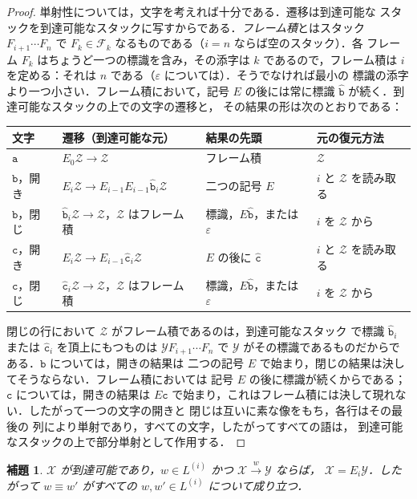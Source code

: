 \documentclass[11pt,a4paper]{ltjsarticle}
\numberwithin{equation}{section}
\theoremstyle{plain}
\newtheorem{lemma}[theorem]{補題}
\theoremstyle{definition}
\theoremstyle{remark}
\newcommand{\eps}{\varepsilon}
\theoremstyle{plain}
\begin{document}
\begin{proof}
単射性については，文字を考えれば十分である．遷移は到達可能な
スタックを到達可能なスタックに写すからである．\emph{フレーム積}とはスタック
$F_{i+1}\cdots F_n$ で $F_k\in\mathcal F_k$ なるものである（$i=n$ ならば空のスタック）．各
フレーム $F_k$ はちょうど一つの標識を含み，その添字は $k$ であるので，フレーム積は
$i$ を定める：それは $n$ である（$\eps$ については）．そうでなければ最小の
標識の添字より一つ小さい．フレーム積において，記号 $E$ の後には常に標識
$\hat{\mathtt b}$ が続く．到達可能なスタックの上での文字の遷移と，
その結果の形は次のとおりである：
\begin{center}
\footnotesize
\renewcommand{\arraystretch}{1.15}
\begin{tabular}{@{}llll@{}}
\hline
文字 & 遷移（到達可能な元） & 結果の先頭 & 元の復元方法\\
\hline
$\mathtt a$ & $E_0\mathcal Z\to\mathcal Z$ & フレーム積 & $\mathcal Z$\\
$\mathtt b$，開き & $E_i\mathcal Z\to E_{i-1}E_{i-1}\hat{\mathtt b}_i\mathcal Z$ & 二つの記号 $E$ & $i$ と $\mathcal Z$ を読み取る\\
$\mathtt b$，閉じ & $\hat{\mathtt b}_i\mathcal Z\to\mathcal Z$，$\mathcal Z$ はフレーム積 & 標識，$E\hat{\mathtt b}$，または $\eps$ & $i$ を $\mathcal Z$ から\\
$\mathtt c$，開き & $E_i\mathcal Z\to E_{i-1}\hat{\mathtt c}_i\mathcal Z$ & $E$ の後に $\hat{\mathtt c}$ & $i$ と $\mathcal Z$ を読み取る\\
$\mathtt c$，閉じ & $\hat{\mathtt c}_i\mathcal Z\to\mathcal Z$，$\mathcal Z$ はフレーム積 & 標識，$E\hat{\mathtt b}$，または $\eps$ & $i$ を $\mathcal Z$ から\\
\hline
\end{tabular}
\end{center}
閉じの行において $\mathcal Z$ がフレーム積であるのは，到達可能なスタック
で標識 $\hat{\mathtt b}_i$ または $\hat{\mathtt c}_i$ を頂上にもつものは $\mathcal YF_{i+1}\cdots
F_n$ で $\mathcal Y$ がその標識であるものだからである．$\mathtt b$ については，開きの結果は
二つの記号 $E$ で始まり，閉じの結果は決してそうならない．フレーム積においては
記号 $E$ の後に標識が続くからである；$\mathtt c$ については，開きの結果は
$E\hat{\mathtt c}$ で始まり，これはフレーム積には決して現れない．したがって一つの文字の開きと
閉じは互いに素な像をもち，各行はその最後の
列により単射であり，すべての文字，したがってすべての語は，
到達可能なスタックの上で部分単射として作用する．
\end{proof}

\begin{lemma}\label{lem:app-br-exchange}
\label{lem:app-tl-recognition}
$\mathcal X$ が到達可能であり，$w\in L^{(i)}$ かつ $\mathcal X\xrightarrow{w}\mathcal Y$ ならば，
$\mathcal X=E_i\mathcal Y$．したがって $w\equiv w'$ がすべての $w,w'\in L^{(i)}$ について成り立つ．
\end{lemma}
\end{document}
